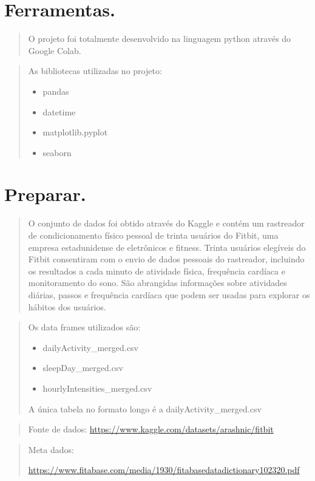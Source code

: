 \documentclass[a4paper, oneside]{report}
\begin{document}
\chapter*{Ferramentas.}
\begin{quotation}
O projeto foi totalmente desenvolvido na linguagem python através do Google Colab.
\end{quotation}
\begin{quotation}    
As bibliotecas utilizadas no projeto:
\begin{itemize}
\item pandas
\item datetime
\item matplotlib.pyplot
\item seaborn
\end{itemize}
\end{quotation}




\chapter*{Preparar.}

\begin{quotation}
O conjunto de dados foi obtido através do Kaggle e contém um rastreador de condicionamento físico pessoal de trinta usuários do Fitbit, uma empresa estadunidense de eletrônicos e fitness. Trinta usuários elegíveis do Fitbit consentiram com o envio de dados pessoais do rastreador, incluindo os resultados a cada minuto de atividade física, frequência cardíaca e monitoramento do sono. São abrangidas informações sobre atividades diárias, passos e frequência cardíaca que podem ser usadas para explorar os hábitos dos usuários.
\end{quotation}
\begin{quotation}
Os data frames utilizados são:
    \begin{itemize}
        \item dailyActivity\_merged.csv
        \item sleepDay\_merged.csv
        \item hourlyIntensities\_merged.csv
    \end{itemize}
 A única tabela no formato longo é a dailyActivity\_merged.csv
\end{quotation}

\begin{quotation}
Fonte de dados:
\url{https://www.kaggle.com/datasets/arashnic/fitbit}
\end{quotation}
\begin{quotation}
Meta dados: 

\url{https://www.fitabase.com/media/1930/fitabasedatadictionary102320.pdf}
\end{quotation}
\end{document}
